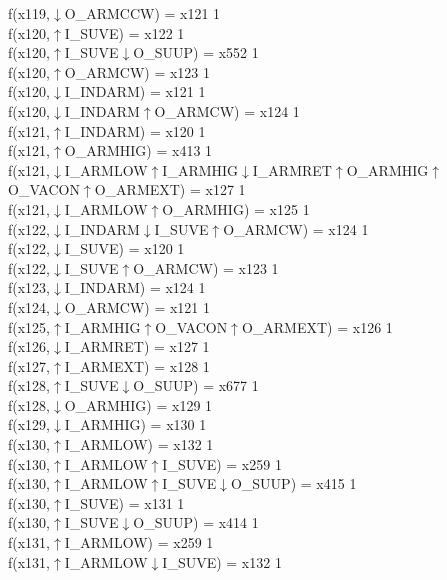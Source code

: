 f(x119,$\downarrow$O\_ARMCCW) = x121 {1} \\
f(x120,$\uparrow$I\_SUVE) = x122 {1} \\
f(x120,$\uparrow$I\_SUVE$\downarrow$O\_SUUP) = x552 {1} \\
f(x120,$\uparrow$O\_ARMCW) = x123 {1} \\
f(x120,$\downarrow$I\_INDARM) = x121 {1} \\
f(x120,$\downarrow$I\_INDARM$\uparrow$O\_ARMCW) = x124 {1} \\
f(x121,$\uparrow$I\_INDARM) = x120 {1} \\
f(x121,$\uparrow$O\_ARMHIG) = x413 {1} \\
f(x121,$\downarrow$I\_ARMLOW$\uparrow$I\_ARMHIG$\downarrow$I\_ARMRET$\uparrow$O\_ARMHIG$\uparrow$O\_VACON$\uparrow$O\_ARMEXT) = x127 {1} \\
f(x121,$\downarrow$I\_ARMLOW$\uparrow$O\_ARMHIG) = x125 {1} \\
f(x122,$\downarrow$I\_INDARM$\downarrow$I\_SUVE$\uparrow$O\_ARMCW) = x124 {1} \\
f(x122,$\downarrow$I\_SUVE) = x120 {1} \\
f(x122,$\downarrow$I\_SUVE$\uparrow$O\_ARMCW) = x123 {1} \\
f(x123,$\downarrow$I\_INDARM) = x124 {1} \\
f(x124,$\downarrow$O\_ARMCW) = x121 {1} \\
f(x125,$\uparrow$I\_ARMHIG$\uparrow$O\_VACON$\uparrow$O\_ARMEXT) = x126 {1} \\
f(x126,$\downarrow$I\_ARMRET) = x127 {1} \\
f(x127,$\uparrow$I\_ARMEXT) = x128 {1} \\
f(x128,$\uparrow$I\_SUVE$\downarrow$O\_SUUP) = x677 {1} \\
f(x128,$\downarrow$O\_ARMHIG) = x129 {1} \\
f(x129,$\downarrow$I\_ARMHIG) = x130 {1} \\
f(x130,$\uparrow$I\_ARMLOW) = x132 {1} \\
f(x130,$\uparrow$I\_ARMLOW$\uparrow$I\_SUVE) = x259 {1} \\
f(x130,$\uparrow$I\_ARMLOW$\uparrow$I\_SUVE$\downarrow$O\_SUUP) = x415 {1} \\
f(x130,$\uparrow$I\_SUVE) = x131 {1} \\
f(x130,$\uparrow$I\_SUVE$\downarrow$O\_SUUP) = x414 {1} \\
f(x131,$\uparrow$I\_ARMLOW) = x259 {1} \\
f(x131,$\uparrow$I\_ARMLOW$\downarrow$I\_SUVE) = x132 {1} \\
